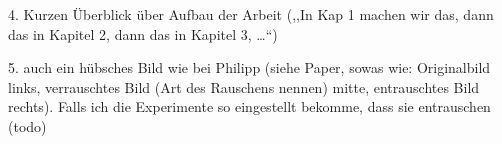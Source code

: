 4. Kurzen Überblick über Aufbau der Arbeit (,,In Kap 1 machen wir das, dann das
in Kapitel 2, dann das in Kapitel 3, \ldots``)

5. auch ein hübsches Bild wie bei Philipp (siehe Paper, sowas wie: Originalbild 
links, verrauschtes Bild (Art des Rauschens nennen) mitte, entrauschtes Bild
rechts). Falls ich die Experimente so eingestellt bekomme, dass sie entrauschen
 (todo)
